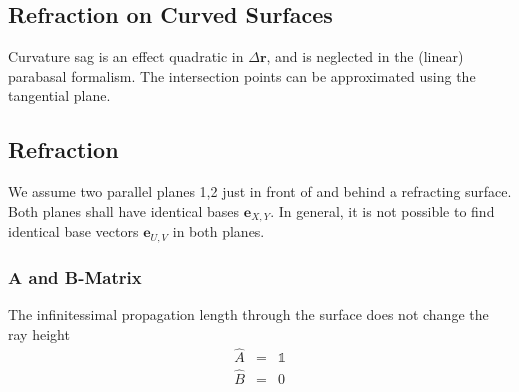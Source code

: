 \documentclass[12pt,a4paper,twoside,openright,BCOR10mm,headsepline,titlepage,abstracton,chapterprefix,final]{scrreprt}
\newcommand\Vector[1]{{\mathbf{#1}}}
\newcommand\unittensor{\mathds{1}}
\begin{document}
\subsection{Refraction on Curved Surfaces}
Curvature sag is an effect quadratic in $\Delta \Vector{r}$, 
and is neglected in the (linear) parabasal formalism.
The intersection points can be approximated using the tangential plane.

\subsection{Refraction}
We assume two parallel planes 1,2 just in front of and behind a refracting surface.
Both planes shall have identical bases $\Vector{e}_{X,Y}$.
In general, it is not possible to find identical base vectors $\Vector{e}_{U,V}$ in both planes.

\subsubsection{A and B-Matrix}
The infinitessimal propagation length through the surface does not change the ray height
\begin{eqnarray}
 \hat{A} &=& \unittensor \\
 \hat{B} &=& 0
\end{eqnarray}
\end{document}
